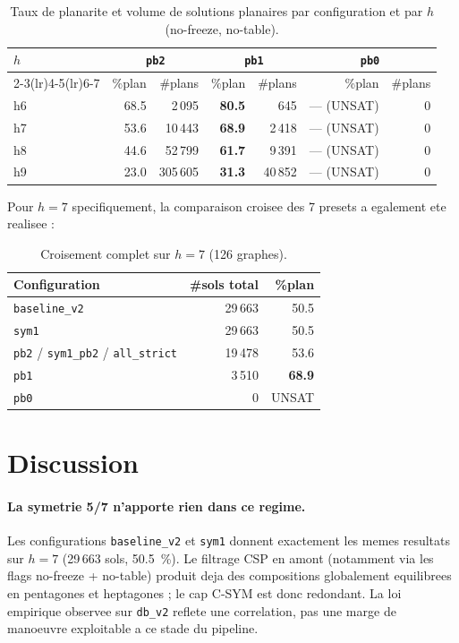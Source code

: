 \documentclass[11pt,a4paper]{article}
\begin{document}
\begin{table}[h]
\centering
\small
\begin{tabular}{lrrrrrr}
\toprule
$h$ & \multicolumn{2}{c}{\texttt{pb2}} & \multicolumn{2}{c}{\texttt{pb1}} & \multicolumn{2}{c}{\texttt{pb0}} \\
\cmidrule(lr){2-3}\cmidrule(lr){4-5}\cmidrule(lr){6-7}
    & \%plan & \#plans & \%plan & \#plans & \%plan & \#plans \\
\midrule
h6 & 68.5 & 2\,095   & \textbf{80.5} & 645    & --- (UNSAT) & 0 \\
h7 & 53.6 & 10\,443  & \textbf{68.9} & 2\,418 & --- (UNSAT) & 0 \\
h8 & 44.6 & 52\,799  & \textbf{61.7} & 9\,391 & --- (UNSAT) & 0 \\
h9 & 23.0 & 305\,605 & \textbf{31.3} & 40\,852 & --- (UNSAT) & 0 \\
\bottomrule
\end{tabular}
\caption{Taux de planarite et volume de solutions planaires par
configuration et par $h$ (no-freeze, no-table).}
\end{table}

Pour $h = 7$ specifiquement, la comparaison croisee des 7 presets a
egalement ete realisee :

\begin{table}[h]
\centering
\small
\begin{tabular}{lrr}
\toprule
Configuration & \#sols total & \%plan \\
\midrule
\texttt{baseline\_v2}                       & 29\,663 & 50.5 \\
\texttt{sym1}                                & 29\,663 & 50.5 \\
\texttt{pb2} / \texttt{sym1\_pb2} / \texttt{all\_strict} & 19\,478 & 53.6 \\
\texttt{pb1}                                 & 3\,510  & \textbf{68.9} \\
\texttt{pb0}                                 & 0       & UNSAT \\
\bottomrule
\end{tabular}
\caption{Croisement complet sur $h = 7$ (126 graphes).}
\end{table}

\section{Discussion}

\paragraph{La symetrie 5/7 n'apporte rien dans ce regime.}
Les configurations \texttt{baseline\_v2} et \texttt{sym1} donnent
exactement les memes resultats sur $h = 7$ (29\,663 sols, 50.5~\%). Le
filtrage CSP en amont (notamment via les flags no-freeze + no-table)
produit deja des compositions globalement equilibrees en pentagones et
heptagones ; le cap C-SYM est donc redondant. La loi empirique observee
sur \texttt{db\_v2} reflete une correlation, pas une marge de
manoeuvre exploitable a ce stade du pipeline.
\end{document}
